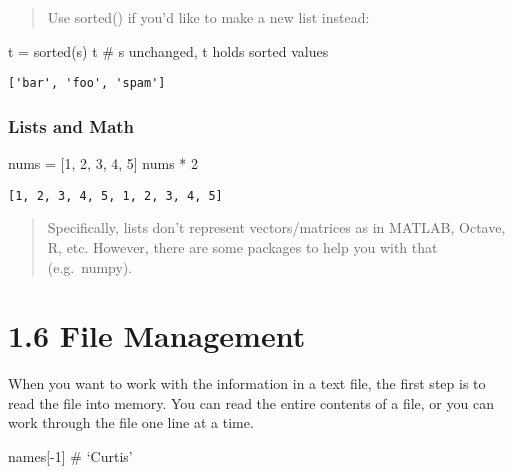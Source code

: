\documentclass[
  letterpaper,
  DIV=11,
  numbers=noendperiod]{scrreprt}
\newenvironment{Shaded}{\begin{snugshade}}{\end{snugshade}}
\newcommand{\BuiltInTok}[1]{\textcolor[rgb]{0.00,0.46,0.62}{#1}}
\newcommand{\BuiltInTok}[1]{\textcolor[rgb]{0.00,0.48,0.65}{#1}}
\newcommand{\CommentTok}[1]{\textcolor[rgb]{0.37,0.37,0.37}{#1}}
\newcommand{\DecValTok}[1]{\textcolor[rgb]{0.68,0.00,0.00}{#1}}
\newcommand{\NormalTok}[1]{\textcolor[rgb]{0.00,0.46,0.62}{#1}}
\newcommand{\OperatorTok}[1]{\textcolor[rgb]{0.37,0.37,0.37}{#1}}
\newcommand{\NormalTok}[1]{\textcolor[rgb]{0.00,0.48,0.65}{#1}}
\newcommand{\OperatorTok}[1]{\textcolor[rgb]{0.37,0.37,0.37}{#1}}
\begin{document}
\begin{Shaded}
\begin{Highlighting}[]
\begin{quote}
Use sorted() if you'd like to make a new list instead:
\end{quote}

\begin{Shaded}
\begin{Highlighting}[]
\NormalTok{t }\OperatorTok{=} \BuiltInTok{sorted}\NormalTok{(s)  }
\NormalTok{t             }\CommentTok{\# s unchanged, t holds sorted values}
\end{Highlighting}
\end{Shaded}

\begin{verbatim}
['bar', 'foo', 'spam']
\end{verbatim}

\hypertarget{lists-and-math}{%
\subsubsection{Lists and Math}\label{lists-and-math}}

\begin{Shaded}
\begin{Highlighting}[]
\NormalTok{nums }\OperatorTok{=}\NormalTok{ [}\DecValTok{1}\NormalTok{, }\DecValTok{2}\NormalTok{, }\DecValTok{3}\NormalTok{, }\DecValTok{4}\NormalTok{, }\DecValTok{5}\NormalTok{]}
\NormalTok{nums }\OperatorTok{*} \DecValTok{2}
\end{Highlighting}
\end{Shaded}

\begin{verbatim}
[1, 2, 3, 4, 5, 1, 2, 3, 4, 5]
\end{verbatim}

\begin{quote}
Specifically, lists don't represent vectors/matrices as in MATLAB,
Octave, R, etc. However, there are some packages to help you with that
(e.g.~numpy).
\end{quote}

\hypertarget{file-management}{%
\section{1.6 File Management}\label{file-management}}

When you want to work with the information in a text file, the first
step is to read the file into memory. You can read the entire contents
of a file, or you can work through the file one line at a time.

names{[}-1{]} \# `Curtis'


\end{Highlighting}
\end{Shaded}
\end{document}
